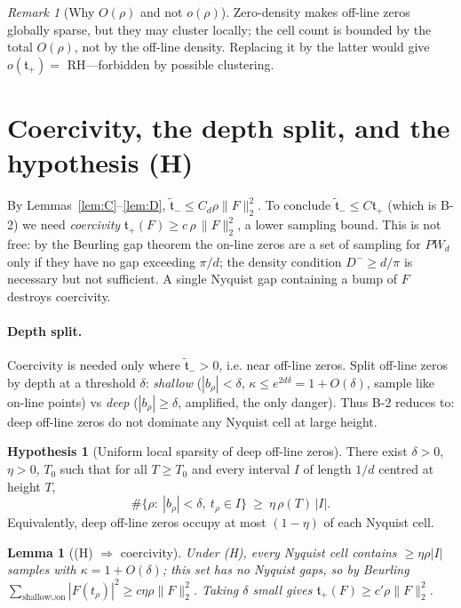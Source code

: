 \documentclass[11pt]{amsart}
\newtheorem{lemma}[theorem]{Lemma}
\theoremstyle{definition}
\newtheorem{hypothesis}[theorem]{Hypothesis}
\theoremstyle{remark}
\newtheorem{remark}[theorem]{Remark}
\newcommand{\PW}{\mathit{PW}_d}
\newcommand{\tplus}{\mathfrak t_+}
\newcommand{\ttilde}{\widetilde{\mathfrak t}_-}
\newcommand{\Norm}[1]{\lVert #1 \rVert}
\begin{document}
\begin{remark}[Why $O(\rho)$ and not $o(\rho)$]
Zero-density makes off-line zeros globally sparse, but they may cluster locally; the cell
count is bounded by the total $O(\rho)$, not by the off-line density. Replacing it by the
latter would give $o(\tplus)=$ RH---forbidden by possible clustering.
\end{remark}

\section{Coercivity, the depth split, and the hypothesis (H)}\label{sec:H}

By Lemmas~\ref{lem:C}--\ref{lem:D}, $\ttilde\le C_d\rho\Norm{F}_2^2$. To conclude
$\ttilde\le C\tplus$ (which is B-2) we need \emph{coercivity}
$\tplus(F)\ge c\,\rho\,\Norm{F}_2^{2}$, a lower sampling bound. This is not free: by the
Beurling gap theorem the on-line zeros are a set of sampling for $\PW$ only if they have
no gap exceeding $\pi/d$; the density condition $D^{-}\ge d/\pi$ is necessary but not
sufficient. A single Nyquist gap containing a bump of $F$ destroys coercivity.

\paragraph{Depth split.} Coercivity is needed only where $\ttilde>0$, i.e. near off-line
zeros. Split off-line zeros by depth at a threshold $\delta$: \emph{shallow}
($|b_\rho|<\delta$, $\kappa\le e^{2d\delta}=1+O(\delta)$, sample like on-line points) vs
\emph{deep} ($|b_\rho|\ge\delta$, amplified, the only danger). Thus B-2 reduces to:
deep off-line zeros do not dominate any Nyquist cell at large height.

\begin{hypothesis}[Uniform local sparsity of deep off-line zeros]\label{def:H}
There exist $\delta>0$, $\eta>0$, $T_0$ such that for all $T\ge T_0$ and every interval
$I$ of length $1/d$ centred at height $T$,
\[
\#\{\rho:\ |b_\rho|<\delta,\ t_\rho\in I\}\ \ge\ \eta\,\rho(T)\,|I| .
\]
Equivalently, deep off-line zeros occupy at most $(1-\eta)$ of each Nyquist cell.
\end{hypothesis}

\begin{lemma}[(H) $\Rightarrow$ coercivity]\label{lem:E}
Under \textnormal{(H)}, every Nyquist cell contains $\ge\eta\rho|I|$ samples with
$\kappa=1+O(\delta)$; this set has no Nyquist gaps, so by Beurling
$\sum_{\text{shallow}\cup\text{on}}|F(t_\rho)|^{2}\ge c\eta\rho\Norm{F}_2^{2}$. Taking
$\delta$ small gives $\tplus(F)\ge c'\rho\Norm{F}_2^{2}$.
\end{lemma}
\end{document}
